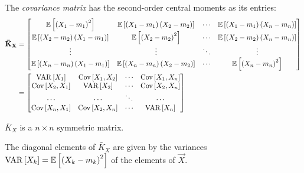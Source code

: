 \begin{definition}\label{def:Covariance Matrix}
  The \emph{covariance matrix} has the second-order central moments as its entries:
  \begin{equation}\label{eq:Covariance Matrix}
    \begin{aligned}
      \mathbf{\bar{K}_{X}}
      &= \begin{bmatrix}
        \operatorname{\operatorname{\mathbb{E}}} \left[ \left( X_{1} - m_{1} \right)^{2} \right] & \operatorname{\operatorname{\mathbb{E}}} \left[ \left( X_{1}-m_{1} \right) \left( X_{2}-m_{2} \right) \right] & \cdots & \operatorname{\operatorname{\mathbb{E}}} \left[ \left( X_{1}-m_{1} \right) \left( X_{n}-m_{n} \right) \right] \\
        \operatorname{\operatorname{\mathbb{E}}} \left[ \left( X_{2}-m_{2} \right) \left( X_{1}-m_{1} \right) \right] & \operatorname{\operatorname{\mathbb{E}}} \left[ \left( X_{2}-m_{2} \right)^{2} \right] & \cdots & \operatorname{\operatorname{\mathbb{E}}} \left[ \left( X_{2}-m_{2} \right) \left( X_{n}-m_{n} \right) \right] \\
        \vdots & \vdots & \ddots & \vdots \\
        \operatorname{\operatorname{\mathbb{E}}} \left[ \left( X_{n}-m_{n} \right) \left( X_{1}-m_{1} \right) \right] & \operatorname{\operatorname{\mathbb{E}}} \left[ \left( X_{n}-m_{n} \right) \left( X_{2}-m_{2} \right) \right] & \cdots & \operatorname{\operatorname{\mathbb{E}}} \left[ \left( X_{n}-m_{n} \right)^{2} \right] \\
      \end{bmatrix} \\
      &= \begin{bmatrix}
        \operatorname{\operatorname{VAR}} \left[ X_{1} \right] & \operatorname{\operatorname{Cov}} \left[X_{1},X_{2} \right] & \cdots & \operatorname{\operatorname{Cov}} \left[ X_{1},X_{n} \right] \\
        \operatorname{\operatorname{Cov}} \left[ X_{2},X_{1} \right] & \operatorname{\operatorname{VAR}} \left[ X_{2} \right]  & \cdots & \operatorname{\operatorname{Cov}} \left[ X_{2},X_{n} \right] \\
        \cdots & \cdots & \ddots & \cdots \\
        \operatorname{\operatorname{Cov}} \left[ X_{n},X_{1} \right] & \operatorname{\operatorname{Cov}} \left[ X_{2},X_{n} \right] & \cdots & \operatorname{\operatorname{VAR}} \left[ X_{n} \right] \\
      \end{bmatrix}
    \end{aligned}
  \end{equation}
  \begin{remark}
    $\bar{K}_{X}$ is a $n \times n$ symmetric matrix.
  \end{remark}
  \begin{remark}
    The diagonal elements of $\bar{K}_{X}$ are given by the variances $\operatorname{\operatorname{VAR}} \left[ X_{k} \right] = \operatorname{\operatorname{\mathbb{E}}} \left[ \left( X_{k}-m_{k} \right)^{2} \right]$ of the elements of $\vec{X}$.

\end{remark}
\end{definition}
